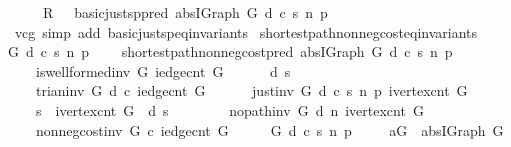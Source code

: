 \begin{isabellebody}
\ \ \ \ {\isasymlbrace}\ {\isasymacute}R\ {\isacharequal}\ \ basic{\isacharunderscore}just{\isacharunderscore}sp{\isacharunderscore}pred\ {\isacharparenleft}abs{\isacharunderscore}IGraph\ G{\isacharparenright}\ d\ c\ s\ n\ p{\isasymrbrace}{\isachardoublequoteclose}\isanewline
%
\isadelimproof
\ \ \ \ %
\endisadelimproof
%
\isatagproof
{}\isamarkupfalse%
\ vcg\ {\isacharparenleft}simp\ add{\isacharcolon}\ basic{\isacharunderscore}just{\isacharunderscore}sp{\isacharunderscore}eq{\isacharunderscore}invariants{\isacharparenright}%
\endisatagproof
{\isafoldproof}%
%
\isadelimproof
\isanewline
%
\endisadelimproof
\isanewline
\isanewline
{}\isamarkupfalse%
\ shortest{\isacharunderscore}path{\isacharunderscore}non{\isacharunderscore}neg{\isacharunderscore}cost{\isacharunderscore}eq{\isacharunderscore}invariants{\isacharcolon}\isanewline
{\isachardoublequoteopen}{\isasymAnd}G\ d\ c\ s\ n\ p\ {\isachardot}\ \isanewline
\ \ shortest{\isacharunderscore}path{\isacharunderscore}non{\isacharunderscore}neg{\isacharunderscore}cost{\isacharunderscore}pred\ {\isacharparenleft}abs{\isacharunderscore}IGraph\ G{\isacharparenright}\ d\ c\ s\ n\ p\ {\isasymlongleftrightarrow}\ \isanewline
\ \ \ \ {\isacharparenleft}is{\isacharunderscore}wellformed{\isacharunderscore}inv\ G\ {\isacharparenleft}iedge{\isacharunderscore}cnt\ G{\isacharparenright}\ {\isasymand}\ \isanewline
\ \ \ \ d\ s\ {\isasymle}\ {}\ {\isasymand}\ \isanewline
\ \ \ \ trian{\isacharunderscore}inv\ G\ d\ c\ {\isacharparenleft}iedge{\isacharunderscore}cnt\ G{\isacharparenright}\ {\isasymand}\ \isanewline
\ \ \ \ just{\isacharunderscore}inv\ G\ d\ c\ s\ n\ p\ {\isacharparenleft}ivertex{\isacharunderscore}cnt\ G{\isacharparenright}\ {\isasymand}\isanewline
\ \ \ \ s\ {\isacharless}\ ivertex{\isacharunderscore}cnt\ G\ {\isasymand}\ d\ s\ {\isacharequal}\ {}\ {\isasymand}\ \isanewline
\ \ \ \ no{\isacharunderscore}path{\isacharunderscore}inv\ G\ d\ n\ {\isacharparenleft}ivertex{\isacharunderscore}cnt\ G{\isacharparenright}\ {\isasymand}\isanewline
\ \ \ \ non{\isacharunderscore}neg{\isacharunderscore}cost{\isacharunderscore}inv\ G\ c\ {\isacharparenleft}iedge{\isacharunderscore}cnt\ G{\isacharparenright}{\isacharparenright}{\isachardoublequoteclose}\isanewline
%
\isadelimproof
%
\endisadelimproof
%
\isatagproof
{}\isamarkupfalse%
\ {\isacharminus}\isanewline
\ \ \isamarkupfalse%
\ G\ d\ c\ s\ n\ p\ \isanewline
\ \ \isamarkupfalse%
\ {\isacharquery}aG\ {\isacharequal}\ {\isachardoublequoteopen}abs{\isacharunderscore}IGraph\ G{\isachardoublequoteclose}\isanewline

\end{isabellebody}
